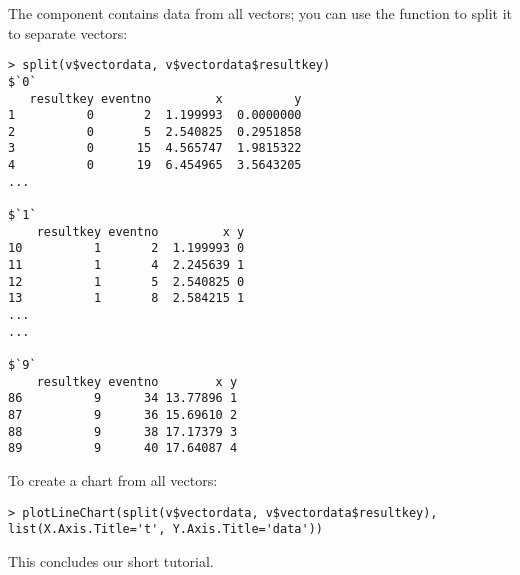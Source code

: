The  component contains data from all vectors;
you can use the  function to split it to separate vectors:

\begin{verbatim}
> split(v$vectordata, v$vectordata$resultkey)
$`0`
   resultkey eventno         x          y
1          0       2  1.199993  0.0000000
2          0       5  2.540825  0.2951858
3          0      15  4.565747  1.9815322
4          0      19  6.454965  3.5643205
...

$`1`
    resultkey eventno         x y
10          1       2  1.199993 0
11          1       4  2.245639 1
12          1       5  2.540825 0
13          1       8  2.584215 1
...
...

$`9`
    resultkey eventno        x y
86          9      34 13.77896 1
87          9      36 15.69610 2
88          9      38 17.17379 3
89          9      40 17.64087 4
\end{verbatim}

To create a chart from all vectors:

\begin{verbatim}
> plotLineChart(split(v$vectordata, v$vectordata$resultkey),
list(X.Axis.Title='t', Y.Axis.Title='data'))
\end{verbatim}


This concludes our short tutorial.
